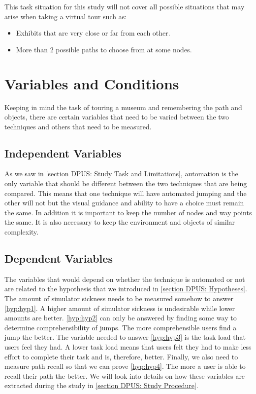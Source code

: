 This task situation for this study will not cover all possible situations that may arise when taking a virtual tour such as:
\begin{itemize}
	\item Exhibits that are very close or far from each other.
	\item More than 2 possible paths to choose from at some nodes.
\end{itemize} 

\section{Variables and Conditions}
\label{section DPUS: Variables and Conditions}
Keeping in mind the task of touring a museum and remembering the path and objects, there are certain variables that need to be varied between the two techniques and others that need to be measured. 

\subsection{Independent Variables}
\label{subsection DPUS VC: Independent Variables}
As we saw in \cref{section DPUS: Study Task and Limitations}, automation is the only variable that should be different between the two techniques that are being compared. This means that one technique will have automated jumping and the other will not but the visual guidance and ability to have a choice must remain the same. In addition it is important to keep the number of nodes and way points the same. It is also necessary to keep the environment and objects of similar complexity. 

\subsection{Dependent Variables}
\label{subsection DPUS VC: Dependent Variables}
The variables that would depend on whether the technique is automated or not are related to the hypothesis that we introduced in \cref{section DPUS: Hypotheses}. The amount of simulator sickness needs to be measured somehow to answer \cref{hyp:hyp1}. A higher amount of simulator sickness is undesirable while lower amounts are better. \cref{hyp:hyp2} can only be answered by finding some way to determine comprehensibility of jumps. The more comprehensible users find a jump the better. The variable needed to answer \cref{hyp:hyp3} is the task load that users feel they had. A lower task load means that users felt they had to make less effort to complete their task and is, therefore, better. Finally, we also need to measure path recall so that we can prove \cref{hyp:hyp4}. The more a user is able to recall their path the better. We will look into details on how these variables are extracted during the study in \cref{section DPUS: Study Procedure}.

